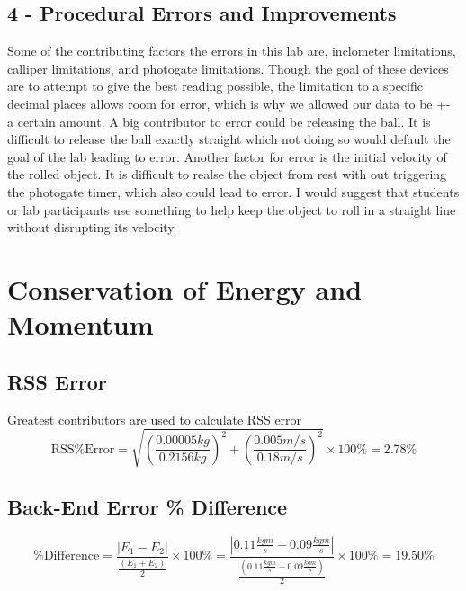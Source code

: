 \section*{4 - Procedural Errors and Improvements}

Some of the contributing factors the errors in this lab are, inclometer limitations, calliper limitations,
and photogate limitations. Though the goal of these devices are to attempt to give the best reading possible,
the limitation to a specific decimal places allows room for error, which is why we allowed our data to be +-
a certain amount. A big contributor to error could be releasing the ball. It is difficult to release the ball exactly 
straight which not doing so would default the goal of the lab leading to error. Another factor for error is the 
initial velocity of the rolled object. It is difficult to realse the object from rest with out triggering 
the photogate timer, which also could lead to error. I would suggest that students or lab participants use something
to help keep the object to roll in a straight line without disrupting its velocity.

\chapter{Conservation of Energy and Momentum}
\section*{RSS Error}

\begin{center}
  \noindent Greatest contributors are used to calculate RSS error
  \begin{equation*}
      \text{RSS\% Error} = \sqrt{ \left( \frac{0.00005kg}{0.2156kg} \right)^2 
      + \left( \frac{0.005 m/s}{0.18m/s} \right)^2}
      \times 100\% = 2.78\%
  \end{equation*}
\end{center}

\section*{Back-End Error \% Difference}

\begin{center}
  \begin{equation*}
    \text{\% Difference} = \frac{|E_1 - E_2|}{\frac{(E_1 + E_2)}{2}} \times 100\% 
    = \frac{|0.11 \frac{kgm}{s} - 0.09 \frac{kgm}{s}|}{\frac{(0.11 \frac{kgm}{s}+ 0.09 \frac{kgm}{s})}{2}} \times 100\% = 19.50\%
  \end{equation*}
\end{center}

